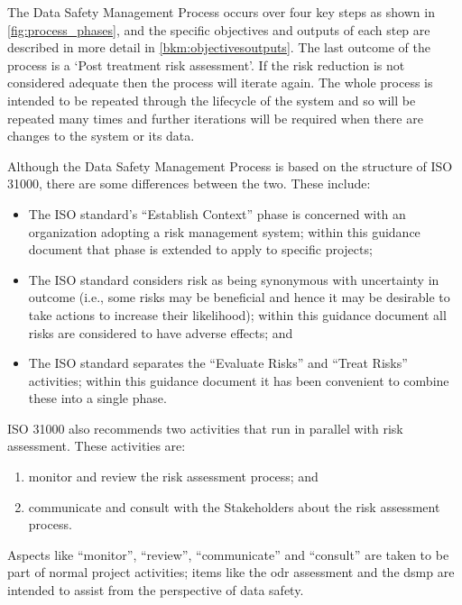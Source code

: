 The Data Safety Management Process occurs over four key steps as shown in \autoref{fig:process_phases}, and the specific
objectives and outputs of each step are described in more detail in \autoref{bkm:objectivesoutputs}. The last outcome of the
process is a `Post treatment risk assessment'. If the risk reduction is not considered adequate then
the process will iterate again. The whole process is intended to be repeated through the lifecycle of
the system and so will be repeated many times and further iterations will be required when there
are changes to the system or its data.

Although the Data Safety Management Process is based on the structure of ISO 31000, there are
some differences between the two. These include:
\begin{itemize}
\item The ISO standard’s ``Establish Context'' phase is concerned with an organization adopting a
	risk management system; within this guidance document that phase is extended to apply to
	specific projects;
\item The ISO standard considers risk as being synonymous with uncertainty in outcome (i.e.,
	some risks may be beneficial and hence it may be desirable to take actions to increase their
	likelihood); within this guidance document all risks are considered to have adverse effects;
	and
\item The ISO standard separates the ``Evaluate Risks'' and ``Treat Risks'' activities; within this
	guidance document it has been convenient to combine these into a single phase.
\end{itemize}

ISO 31000 also recommends two activities that run in parallel with risk assessment. These activities
are:
\begin{enumerate}
\item monitor and review the risk assessment process; and 
\item communicate and consult with the
Stakeholders about the risk assessment process. 
\end{enumerate}
Aspects like ``monitor'', ``review'', ``communicate''
and ``consult'' are taken to be part of normal project activities; items like the \gls{odr} assessment and
the \gls{dsmp} are intended to assist from the perspective of data safety.


